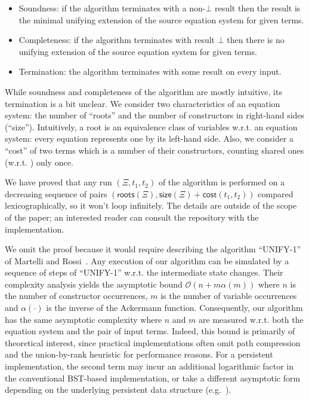 \begin{itemize}
    \item Soundness: if the algorithm terminates with a non-$\bot$ result then the result is the minimal unifying extension of the source equation system for given terms.
    \item Completeness: if the algorithm terminates with result $\bot$ then there is no unifying extension of the source equation system for given terms.
    \item Termination: the algorithm terminates with some result on every input.
\end{itemize}

While soundness and completeness of the algorithm are mostly intuitive, its termination is a bit unclear. We consider two characteristics of an equation system: the number of ``roots'' and the number of constructors in right-hand sides (``size''). Intuitively, a root is an equivalence class of variables w.r.t. an equation system: every equation represents one by its left-hand side. Also, we consider a ``cost'' of two terms which is a number of their constructors, counting shared ones (w.r.t. \commonpart) only once.

We have proved that any run $(\Xi, t_1, t_2)$ of the algorithm is performed on a decreasing sequence of pairs $(\textsf{roots}(\Xi), \textsf{size}(\Xi) + \textsf{cost}(t_1, t_2))$
compared lexicographically, so it won't loop infinitely. The details are outside of the scope of the paper; an interested reader can consult the repository with the \Rocq implementation.

We omit the proof because it would require describing the algorithm ``UNIFY-1'' of Martelli and Rossi~\cite{martelli1984efficient}. Any execution of our algorithm can be simulated by a sequence of steps of ``UNIFY-1'' w.r.t. the intermediate state changes. Their complexity analysis yields the asymptotic bound $\mathcal{O}(n + m \alpha(m))$ where $n$ is the number of constructor occurrences, $m$ is the number of variable occurrences and $\alpha(\cdot)$ is the inverse of the Ackermann function. Consequently, our algorithm has the same asymptotic complexity where $n$ and $m$ are measured w.r.t. both the equation system and the pair of input terms. Indeed, this bound is primarily of theoretical interest, since practical implementations often omit path compression and the union-by-rank heuristic for performance reasons. For a persistent implementation, the second term may incur an additional logarithmic factor in the conventional BST-based implementation, or take a different asymptotic form depending on the underlying persistent data structure (e.g.~\cite{conchon2007persistent}).


